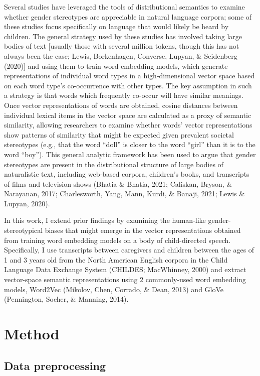 \documentclass[10pt, letterpaper]{article}
\begin{document}
Several studies have leveraged the tools of distributional semantics to
examine whether gender stereotypes are appreciable in natural language
corpora; some of these studies focus specifically on language that would
likely be heard by children. The general strategy used by these studies
has involved taking large bodies of text {[}usually those with several
million tokens, though this has not always been the case; Lewis,
Borkenhagen, Converse, Lupyan, \& Seidenberg (2020){]} and using them to
train word embedding models, which generate representations of
individual word types in a high-dimensional vector space based on each
word type's co-occurrence with other types. The key assumption in such a
strategy is that words which frequently co-occur will have similar
meanings. Once vector representations of words are obtained, cosine
distances between individual lexical items in the vector space are
calculated as a proxy of semantic similarity, allowing researchers to
examine whether words' vector representations show patterns of
similarity that might be expected given prevalent societal stereotypes
(e.g., that the word ``doll'' is closer to the word ``girl'' than it is
to the word ``boy''). This general analytic framework has been used to
argue that gender stereotypes are present in the distributional
structure of large bodies of naturalistic text, including web-based
corpora, children's books, and transcripts of films and television shows
(Bhatia \& Bhatia, 2021; Caliskan, Bryson, \& Narayanan, 2017;
Charlesworth, Yang, Mann, Kurdi, \& Banaji, 2021; Lewis \& Lupyan,
2020).

In this work, I extend prior findings by examining the human-like
gender-stereotypical biases that might emerge in the vector
representations obtained from training word embedding models on a body
of child-directed speech. Specifically, I use transcripts between
caregivers and children between the ages of 1 and 3 years old from the
North American English corpora in the Child Language Data Exchange
System (CHILDES; MacWhinney, 2000) and extract vector-space semantic
representations using 2 commonly-used word embedding models, Word2Vec
(Mikolov, Chen, Corrado, \& Dean, 2013) and GloVe (Pennington, Socher,
\& Manning, 2014).

\hypertarget{method}{%
\section{Method}\label{method}}

\hypertarget{data-preprocessing}{%
\subsection{Data preprocessing}\label{data-preprocessing}}
\end{document}
